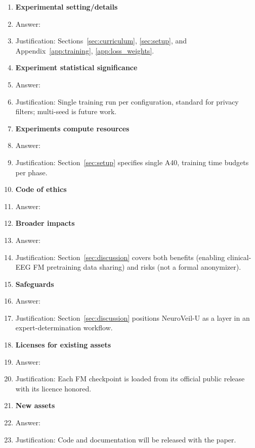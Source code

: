 \begin{enumerate}
\item {\bf Experimental setting/details}
    \item[] Answer: \answerYes{}
    \item[] Justification: Sections~\ref{sec:curriculum}, \ref{sec:setup}, and Appendix~\ref{app:training}, \ref{app:loss_weights}.

\item {\bf Experiment statistical significance}
    \item[] Answer: \answerNA{}
    \item[] Justification: Single training run per configuration, standard for privacy filters; multi-seed is future work.

\item {\bf Experiments compute resources}
    \item[] Answer: \answerYes{}
    \item[] Justification: Section~\ref{sec:setup} specifies single A40, training time budgets per phase.

\item {\bf Code of ethics}
    \item[] Answer: \answerYes{}

\item {\bf Broader impacts}
    \item[] Answer: \answerYes{}
    \item[] Justification: Section~\ref{sec:discussion} covers both benefits (enabling clinical-EEG FM pretraining data sharing) and risks (not a formal anonymizer).

\item {\bf Safeguards}
    \item[] Answer: \answerYes{}
    \item[] Justification: Section~\ref{sec:discussion} positions NeuroVeil-U as a layer in an expert-determination workflow.

\item {\bf Licenses for existing assets}
    \item[] Answer: \answerYes{}
    \item[] Justification: Each FM checkpoint is loaded from its official public release with its licence honored.

\item {\bf New assets}
    \item[] Answer: \answerYes{}
    \item[] Justification: Code and documentation will be released with the paper.


\end{enumerate}
